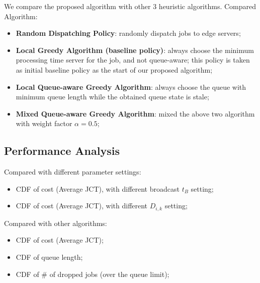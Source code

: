 We compare the proposed algorithm with other 3 heuristic algorithms.
Compared Algorithm:
\begin{itemize}
    \item \textbf{Random Dispatching Policy}:
            randomly dispatch jobs to edge servers;
    \item \textbf{Local Greedy Algorithm (baseline policy)}:
            always choose the minimum processing time server for the job, and not queue-aware; this policy is taken as initial baseline policy as the start of our proposed algorithm;
    \item \textbf{Local Queue-aware Greedy Algorithm}:
            always choose the queue with minimum queue length while the obtained queue state is stale;
    \item \textbf{Mixed Queue-aware Greedy Algorithm}:
            mixed the above two algorithm with weight factor $\alpha = 0.5$;
\end{itemize}


\subsection{Performance Analysis}
Compared with different parameter settings:
\begin{itemize}
    \item CDF of cost (Average JCT), with different broadcast $t_B$ setting;
    \item CDF of cost (Average JCT), with different \brlatency $D_{i,k}$ setting;
\end{itemize}

Compared with other algorithms:
\begin{itemize}
    \item CDF of cost (Average JCT);
    \item CDF of queue length;
    \item CDF of \# of dropped jobs (over the queue limit);
\end{itemize}